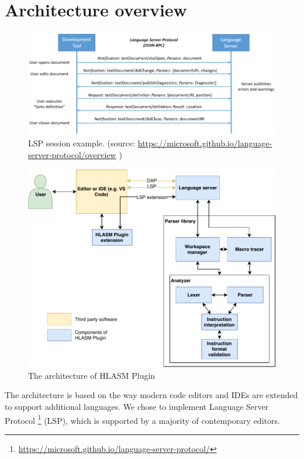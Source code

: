 \chapter{Architecture overview}
\label{arch}
\begin{figure}
	\centering
	\includegraphics[width=\textwidth]{img/language-server-sequence}
	\caption[LSP session example.]{LSP session example. (source: \url{https://microsoft.github.io/language-server-protocol/overview} )}
	\label{fig04:LSP}
\end{figure}

\begin{figure}
	\centering
	\includegraphics[width=\textwidth]{img/hlasm_architecture}
	\caption{The architecture of HLASM Plugin}
	
	\label{fig04:arch}
\end{figure}

The architecture is based on the way modern code editors and IDEs are extended to support additional languages. We chose to implement Language Server Protocol \footnote{\url{https://microsoft.github.io/language-server-protocol/}} (LSP), which is supported by a majority of contemporary editors.

